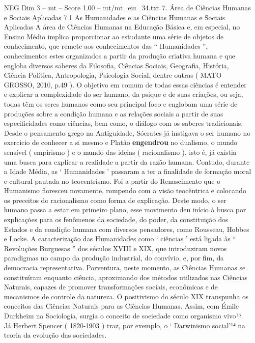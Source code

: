 \begin{textsample}{NEG Dim 3 – mt – Score 1.00 – mt/mt\_em\_34.txt}  \label{ex:f3_neg_212}
7.
Área de Ciências Humanas e Sociais Aplicadas 7.1 As Humanidades e as Ciências Humanas e Sociais Aplicadas A área de Ciências Humanas na Educação Básica e, em especial, no Ensino Médio implica proporcionar ao estudante uma série de objetos de conhecimento, que remete aos conhecimentos das “ Humanidades ”, conhecimentos estes organizados a partir da produção criativa humana e que engloba diversos saberes da Filosofia, Ciências Sociais, Geografia, História, Ciência Política, Antropologia, Psicologia Social, dentre outras ( MATO GROSSO, 2010, p.49 ).
O objetivo em comum de todas essas ciências é entender e explicar a complexidade do ser humano, da psique e de suas criações, ou seja, todas têm os seres humanos como seu principal foco e englobam uma série de produções sobre a condição humana e as relações sociais a partir de suas especificidades como ciências, bem como, o diálogo com os saberes tradicionais.
Desde o pensamento grego na Antiguidade, Sócrates já instigava o ser humano no exercício de conhecer a si mesmo e Platão \textbf{engendrou} no dualismo, o mundo sensível ( empirismo ) e o mundo das ideias ( racionalismo ), isto é, já existia uma busca para explicar a realidade a partir da razão humana.
Contudo, durante a Idade Média, as ‘ Humanidades ’ passaram a ter a finalidade de formação moral e cultural pautada no teocentrismo.
Foi a partir do Renascimento que o Humanismo floresceu novamente, rompendo com a visão teocêntrica e colocando os preceitos do racionalismo como forma de explicação.
Deste modo, o ser humano passa a estar em primeiro plano, esse movimento deu início à busca por explicações para os fenômenos da sociedade, do poder, da constituição dos Estados e da condição humana com diversos pensadores, como Rousseau, Hobbes e Locke.
A caracterização das Humanidades como ‘ ciências ’ está ligada às “ Revoluções Burguesas ” dos séculos XVIII e XIX, que introduziram novos paradigmas no campo da produção industrial, do convívio, e, por fim, da democracia representativa.
Porventura, neste momento, as Ciências Humanas se constituíram enquanto ciência, aproximando dos métodos utilizados nas Ciências Naturais, capazes de promover transformações sociais, econômicas e de mecanismos de controle da natureza.
O positivismo do século XIX transpunha os conceitos das Ciências Naturais para as Ciências Humanas.
Assim, com Émile Durkheim na Sociologia, surgia o conceito de sociedade como organismo vivo¹³.
Já Herbert Spencer ( 1820-1903 ) traz, por exemplo, o ‘ Darwinismo social’¹⁴ na teoria da evolução das sociedades.

\end{textsample}
